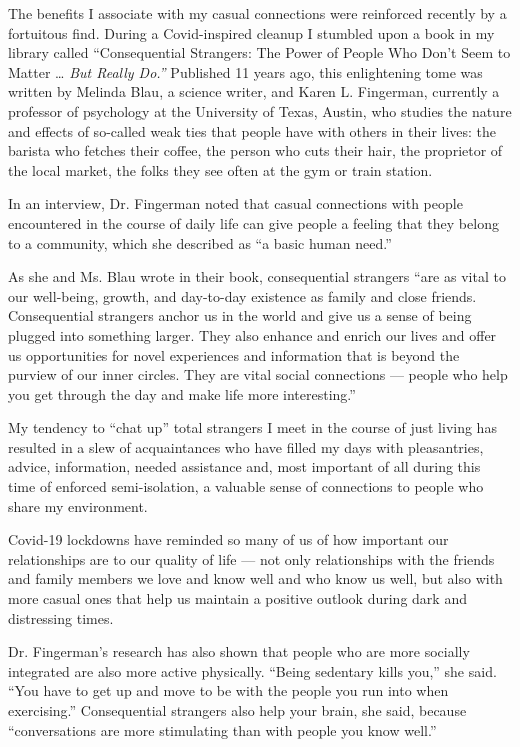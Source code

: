 The benefits I associate with my casual connections were reinforced
recently by a fortuitous find. During a Covid-inspired cleanup I
stumbled upon a book in my library called ``Consequential Strangers: The
Power of People Who Don't Seem to Matter \ldots{} \emph{But Really
Do.''} Published 11 years ago, this enlightening tome was written by
Melinda Blau, a science writer, and Karen L. Fingerman, currently a
professor of psychology at the University of Texas, Austin, who studies
the nature and effects of so-called weak ties that people have with
others in their lives: the barista who fetches their coffee, the person
who cuts their hair, the proprietor of the local market, the folks they
see often at the gym or train station.

In an interview, Dr. Fingerman noted that casual connections with people
encountered in the course of daily life can give people a feeling that
they belong to a community, which she described as ``a basic human
need.''

As she and Ms. Blau wrote in their book, consequential strangers ``are
as vital to our well-being, growth, and day-to-day existence as family
and close friends. Consequential strangers anchor us in the world and
give us a sense of being plugged into something larger. They also
enhance and enrich our lives and offer us opportunities for novel
experiences and information that is beyond the purview of our inner
circles. They are vital social connections --- people who help you get
through the day and make life more interesting.''

My tendency to ``chat up'' total strangers I meet in the course of just
living has resulted in a slew of acquaintances who have filled my days
with pleasantries, advice, information, needed assistance and, most
important of all during this time of enforced semi-isolation, a valuable
sense of connections to people who share my environment.

Covid-19 lockdowns have reminded so many of us of how important our
relationships are to our quality of life --- not only relationships with
the friends and family members we love and know well and who know us
well, but also with more casual ones that help us maintain a positive
outlook during dark and distressing times.

Dr. Fingerman's research has also shown that people who are more
socially integrated are also more active physically. ``Being sedentary
kills you,'' she said. ``You have to get up and move to be with the
people you run into when exercising.'' Consequential strangers also help
your brain, she said, because ``conversations are more stimulating than
with people you know well.''

